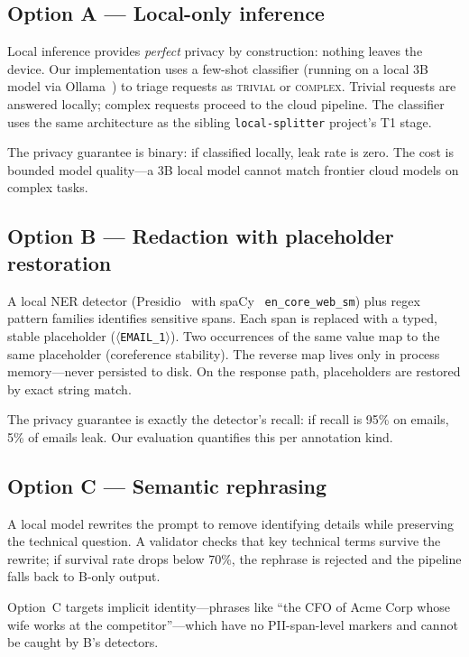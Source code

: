 \documentclass[11pt,a4paper]{article}
\begin{document}
\subsection{Option A --- Local-only inference}

Local inference provides \emph{perfect} privacy by construction:
nothing leaves the device.  Our implementation uses a few-shot
classifier (running on a local 3B model via Ollama~\cite{ollama}) to triage
requests as \textsc{trivial} or \textsc{complex}.  Trivial
requests are answered locally; complex requests proceed to the
cloud pipeline.  The classifier uses the same architecture as
the sibling \texttt{local-splitter} project's T1 stage.

The privacy guarantee is binary: if classified locally, leak
rate is zero.  The cost is bounded model quality---a 3B local
model cannot match frontier cloud models on complex tasks.

\subsection{Option B --- Redaction with placeholder restoration}

A local NER detector (Presidio~\cite{presidio} with
spaCy~\cite{spacy} \texttt{en\_core\_web\_sm}) plus regex pattern
families identifies sensitive spans.  Each span
is replaced with a typed, stable placeholder
(\texttt{$\langle$EMAIL\_1$\rangle$}).
Two occurrences of the same value map to the same placeholder
(coreference stability).  The reverse map lives only in process
memory---never persisted to disk.  On the response path,
placeholders are restored by exact string match.

The privacy guarantee is exactly the detector's recall: if
recall is 95\% on emails, 5\% of emails leak.  Our evaluation
quantifies this per annotation kind.

\subsection{Option C --- Semantic rephrasing}

A local model rewrites the prompt to remove identifying details
while preserving the technical question.  A validator checks that
key technical terms survive the rewrite; if survival rate drops
below 70\%, the rephrase is rejected and the pipeline falls back
to B-only output.

Option~C targets implicit identity---phrases like ``the CFO of
Acme Corp whose wife works at the competitor''---which have no
PII-span-level markers and cannot be caught by B's detectors.
\end{document}

